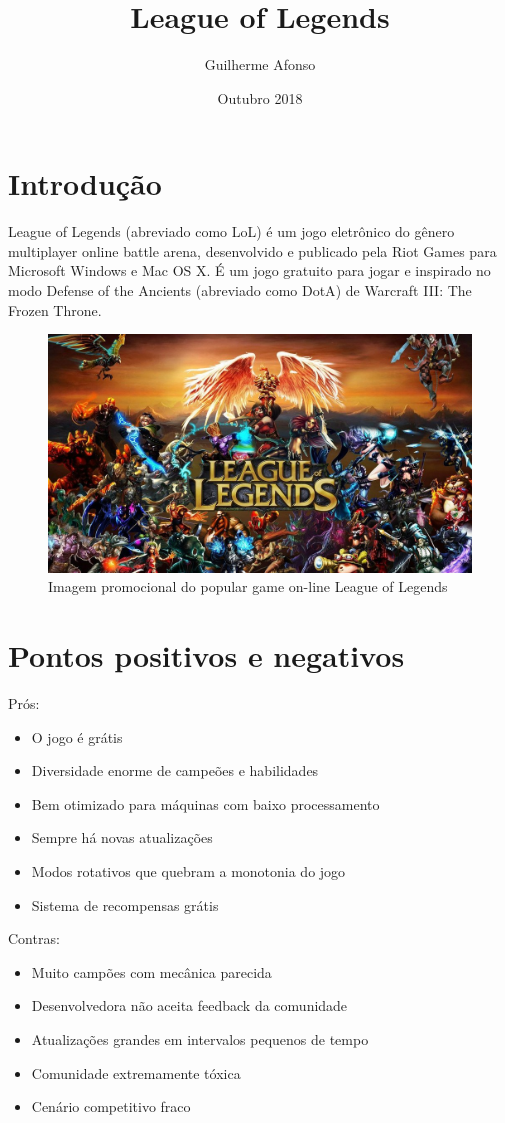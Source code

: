 \documentclass{article}
\title{League of Legends}
\author{Guilherme Afonso}
\date{Outubro 2018}
\begin{document}
\maketitle

\section{Introdução}
League of Legends\cite{wiki:League_of_Legends} (abreviado como LoL) é um jogo eletrônico do gênero multiplayer online battle arena, desenvolvido e publicado pela Riot Games para Microsoft Windows e Mac OS X. É um jogo gratuito para jogar e inspirado no modo Defense of the Ancients (abreviado como DotA\cite{wiki:Dota}) de Warcraft III: The Frozen Throne.

\begin{figure}[h!]
\centering
\includegraphics[scale=0.2]{league}
\caption{Imagem promocional do popular game on-line League of Legends}
\label{fig:league}
\end{figure}

\section{Pontos positivos e negativos}
Prós:
\begin{itemize}
   \item O jogo é grátis
   \item Diversidade enorme de campeões e habilidades
   \item Bem otimizado para máquinas com baixo processamento
   \item Sempre há novas atualizações
   \item Modos rotativos que quebram a monotonia do jogo
   \item Sistema de recompensas grátis
 \end{itemize}
 \vspace{0.5cm}
 \noindent
Contras:
\begin{itemize}
   \item Muito campões com mecânica parecida
   \item Desenvolvedora não aceita feedback da comunidade
   \item Atualizações grandes em intervalos pequenos de tempo
   \item Comunidade extremamente tóxica
   \item Cenário competitivo fraco
\end{itemize}
\end{document}
